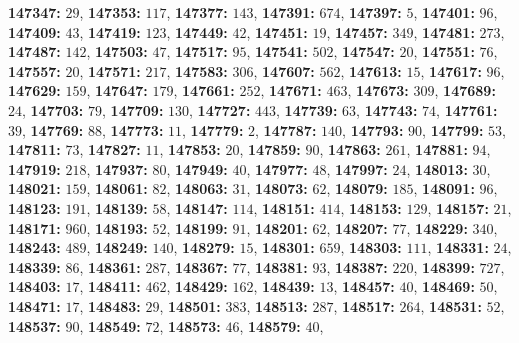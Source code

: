\textsf{\bfseries 147347:} $29$, \textsf{\bfseries 147353:} $117$, \textsf{\bfseries 147377:} $143$, \textsf{\bfseries 147391:} $674$, \textsf{\bfseries 147397:} $5$, \textsf{\bfseries 147401:} $96$, \textsf{\bfseries 147409:} $43$, \textsf{\bfseries 147419:} $123$, \textsf{\bfseries 147449:} $42$, \textsf{\bfseries 147451:} $19$, \textsf{\bfseries 147457:} $349$, \textsf{\bfseries 147481:} $273$, \textsf{\bfseries 147487:} $142$, \textsf{\bfseries 147503:} $47$, \textsf{\bfseries 147517:} $95$, \textsf{\bfseries 147541:} $502$, \textsf{\bfseries 147547:} $20$, \textsf{\bfseries 147551:} $76$, \textsf{\bfseries 147557:} $20$, \textsf{\bfseries 147571:} $217$, \textsf{\bfseries 147583:} $306$, \textsf{\bfseries 147607:} $562$, \textsf{\bfseries 147613:} $15$, \textsf{\bfseries 147617:} $96$, \textsf{\bfseries 147629:} $159$, \textsf{\bfseries 147647:} $179$, \textsf{\bfseries 147661:} $252$, \textsf{\bfseries 147671:} $463$, \textsf{\bfseries 147673:} $309$, \textsf{\bfseries 147689:} $24$, \textsf{\bfseries 147703:} $79$, \textsf{\bfseries 147709:} $130$, \textsf{\bfseries 147727:} $443$, \textsf{\bfseries 147739:} $63$, \textsf{\bfseries 147743:} $74$, \textsf{\bfseries 147761:} $39$, \textsf{\bfseries 147769:} $88$, \textsf{\bfseries 147773:} $11$, \textsf{\bfseries 147779:} $2$, \textsf{\bfseries 147787:} $140$, \textsf{\bfseries 147793:} $90$, \textsf{\bfseries 147799:} $53$, \textsf{\bfseries 147811:} $73$, \textsf{\bfseries 147827:} $11$, \textsf{\bfseries 147853:} $20$, \textsf{\bfseries 147859:} $90$, \textsf{\bfseries 147863:} $261$, \textsf{\bfseries 147881:} $94$, \textsf{\bfseries 147919:} $218$, \textsf{\bfseries 147937:} $80$, \textsf{\bfseries 147949:} $40$, \textsf{\bfseries 147977:} $48$, \textsf{\bfseries 147997:} $24$, \textsf{\bfseries 148013:} $30$, \textsf{\bfseries 148021:} $159$, \textsf{\bfseries 148061:} $82$, \textsf{\bfseries 148063:} $31$, \textsf{\bfseries 148073:} $62$, \textsf{\bfseries 148079:} $185$, \textsf{\bfseries 148091:} $96$, \textsf{\bfseries 148123:} $191$, \textsf{\bfseries 148139:} $58$, \textsf{\bfseries 148147:} $114$, \textsf{\bfseries 148151:} $414$, \textsf{\bfseries 148153:} $129$, \textsf{\bfseries 148157:} $21$, \textsf{\bfseries 148171:} $960$, \textsf{\bfseries 148193:} $52$, \textsf{\bfseries 148199:} $91$, \textsf{\bfseries 148201:} $62$, \textsf{\bfseries 148207:} $77$, \textsf{\bfseries 148229:} $340$, \textsf{\bfseries 148243:} $489$, \textsf{\bfseries 148249:} $140$, \textsf{\bfseries 148279:} $15$, \textsf{\bfseries 148301:} $659$, \textsf{\bfseries 148303:} $111$, \textsf{\bfseries 148331:} $24$, \textsf{\bfseries 148339:} $86$, \textsf{\bfseries 148361:} $287$, \textsf{\bfseries 148367:} $77$, \textsf{\bfseries 148381:} $93$, \textsf{\bfseries 148387:} $220$, \textsf{\bfseries 148399:} $727$, \textsf{\bfseries 148403:} $17$, \textsf{\bfseries 148411:} $462$, \textsf{\bfseries 148429:} $162$, \textsf{\bfseries 148439:} $13$, \textsf{\bfseries 148457:} $40$, \textsf{\bfseries 148469:} $50$, \textsf{\bfseries 148471:} $17$, \textsf{\bfseries 148483:} $29$, \textsf{\bfseries 148501:} $383$, \textsf{\bfseries 148513:} $287$, \textsf{\bfseries 148517:} $264$, \textsf{\bfseries 148531:} $52$, \textsf{\bfseries 148537:} $90$, \textsf{\bfseries 148549:} $72$, \textsf{\bfseries 148573:} $46$, \textsf{\bfseries 148579:} $40$, 
